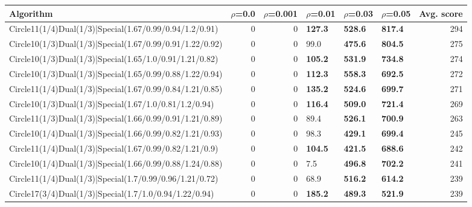 \begin{tabular}{lrrlllr}
\hline
 Algorithm                                                      &   $\rho$=0.0 &   $\rho$=0.001 & $\rho$=0.01    & $\rho$=0.03    & $\rho$=0.05    &   Avg. score \\
\hline
 Circle11(1/4)Dual(1/3)|Special(1.67/0.99/0.94/1.2/0.91)        &          0   &            0   & \textbf{127.3} & \textbf{528.6} & \textbf{817.4} &          294 \\
 Circle10(1/3)Dual(1/3)|Special(1.67/0.99/0.91/1.22/0.92)       &          0   &            0   & 99.0           & \textbf{475.6} & \textbf{804.5} &          275 \\
 Circle10(1/3)Dual(1/3)|Special(1.65/1.0/0.91/1.21/0.82)        &          0   &            0   & \textbf{105.2} & \textbf{531.9} & \textbf{734.8} &          274 \\
 Circle10(1/3)Dual(1/3)|Special(1.65/0.99/0.88/1.22/0.94)       &          0   &            0   & \textbf{112.3} & \textbf{558.3} & \textbf{692.5} &          272 \\
 Circle11(1/4)Dual(1/3)|Special(1.67/0.99/0.84/1.21/0.85)       &          0   &            0   & \textbf{135.2} & \textbf{524.6} & \textbf{699.7} &          271 \\
 Circle10(1/3)Dual(1/3)|Special(1.67/1.0/0.81/1.2/0.94)         &          0   &            0   & \textbf{116.4} & \textbf{509.0} & \textbf{721.4} &          269 \\
 Circle11(1/3)Dual(1/3)|Special(1.66/0.99/0.91/1.21/0.89)       &          0   &            0   & 89.4           & \textbf{526.1} & \textbf{700.9} &          263 \\
 Circle10(1/4)Dual(1/3)|Special(1.66/0.99/0.82/1.21/0.93)       &          0   &            0   & 98.3           & \textbf{429.1} & \textbf{699.4} &          245 \\
 Circle11(1/4)Dual(1/3)|Special(1.67/0.99/0.82/1.21/0.9)        &          0   &            0   & \textbf{104.5} & \textbf{421.5} & \textbf{688.6} &          242 \\
 Circle10(1/4)Dual(1/3)|Special(1.66/0.99/0.88/1.24/0.88)       &          0   &            0   & 7.5            & \textbf{496.8} & \textbf{702.2} &          241 \\
 Circle11(1/4)Dual(1/3)|Special(1.7/0.99/0.96/1.21/0.72)        &          0   &            0   & 68.9           & \textbf{516.2} & \textbf{614.2} &          239 \\
 Circle17(3/4)Dual(1/3)|Special(1.7/1.0/0.94/1.22/0.94)         &          0   &            0   & \textbf{185.2} & \textbf{489.3} & \textbf{521.9} &          239 \\

\end{tabular}
